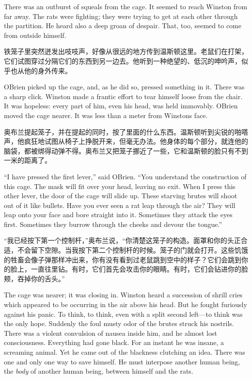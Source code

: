 \begin{paracol}{2}
\switchcolumn*

There was an outburst of squeals from the cage. It seemed to reach
Winston from far away. The rats were fighting; they were trying to get
at each other through the partition. He heard also a deep groan of
despair. That, too, seemed to come from outside himself.

\switchcolumn

铁笼子里突然迸发出吱吱声，好像从很远的地方传到温斯顿这里。老鼠们在打架，它们试图穿过分隔它们的东西到另一边去。他听到一种绝望的、低沉的呻吟声，似乎也从他的身外传来。

\switchcolumn*

O\textquotesingle Brien picked up the cage, and, as he did so, pressed
something in it. There was a sharp click. Winston made a frantic effort
to tear himself loose from the chair. It was hopeless: every part of
him, even his head, was held immovably. O\textquotesingle Brien moved
the cage nearer. It was less than a meter from Winston\textquotesingle s
face.

\switchcolumn

奥布兰提起笼子，并在提起的同时，按了里面的什么东西。温斯顿听到尖锐的啪嗒声，他疯狂地试图从椅子上挣脱开来，但毫无办法。他身体的每个部分，就连他的脑袋，都被绑得动弹不得。奥布兰又把笼子挪近了一些，它和温斯顿的脸只有不到一米的距离了。

\switchcolumn*

``I have pressed the first lever,'' said O\textquotesingle Brien. ``You
understand the construction of this cage. The mask will fit over your
head, leaving no exit. When I press this other lever, the door of the
cage will slide up. These starving brutes will shoot out of it like
bullets. Have you ever seen a rat leap through the air? They will leap
onto your face and bore straight into it. Sometimes they attack the eyes
first. Sometimes they burrow through the cheeks and devour the tongue.''

\switchcolumn

``我已经按下第一个控制杆，''奥布兰说，``你清楚这笼子的构造。面罩和你的头正合适，不会留下空隙。当我按下第二个控制杆的时候。笼子的门就会打开。这些饥饿的牲畜会像子弹那样冲出来，你有没有看到过老鼠跳到空中的样子？它们会跳到你的脸上，一直往里钻。有时，它们首先会攻击你的眼睛。有时，它们会钻进你的脸颊，吞掉你的舌头。''

\switchcolumn*

The cage was nearer; it was closing in. Winston heard a succession of
shrill cries which appeared to be occurring in the air above his head.
But he fought furiously against his panic. To think, to think, even with
a split second left---to think was the only hope. Suddenly the foul
musty odor of the brutes struck his nostrils. There was a violent
convulsion of nausea inside him, and he almost lost consciousness.
Everything had gone black. For an instant he was insane, a screaming
animal. Yet he came out of the blackness clutching an idea. There was
one and only one way to save himself. He must interpose another human
being, the \emph{body} of another human being, between himself and the
rats.


\end{paracol}

